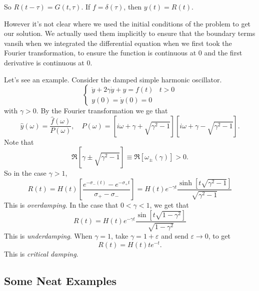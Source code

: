 \documentclass{article}
\begin{document}
So $ R(t-\tau)=G(t,\tau) $. If $ f=\delta(\tau) $, then $ y(t)=R(t) $.\par
However it's not clear where we used the initial conditions of the problem to get our solution. We actually used them implicitly to ensure that the boundary terms vansih when we integrated the differential equation when we first took the Fourier transformation, to ensure the function is continuous at $ 0 $ and the first derivative is continuous at $ 0 $.\par
Let's see an example. Consider the damped simple harmonic oscillator.
\[
  \begin{cases}
	  \ddot y + 2\gamma \dot y+y=f(t) & t>0\\
	  y(0) = \dot y(0)=0
  \end{cases}
\]
with $ \gamma>0 $. By the Fourier transformation we ge that
\[
	\hat y(\omega)=\frac{\hat f(\omega)}{P(\omega)},\quad P(\omega)=[i\omega+\gamma+\sqrt{\gamma^2-1}][i\omega+\gamma-\sqrt{\gamma^2-1}].
\]
Note that
\[
	\Re[\gamma\pm \sqrt{\gamma^2-1}]\equiv \Re[\omega_\pm(\gamma)]>0.
\]
So in the case $ \gamma>1 $,
\[
	R(t)=H(t)\left[\frac{e^{-\sigma_-(t)}-e^{-\sigma_+t}}{\sigma_+-\sigma_-}\right]=H(t)e^{-\gamma t}\frac{\sinh[t\sqrt{\gamma^2-1}]}{\sqrt{\gamma^2-1}}
\]
This is \textit{overdamping}. In the case that $ 0<\gamma<1 $, we get that
\[
	R(t)=H(t)e^{-\gamma t }\frac{\sin[t\sqrt{1-\gamma^2}]}{\sqrt{1-\gamma^2}}
\]
This is \textit{underdamping}. When $ \gamma=1 $, take $ \gamma=1+\varepsilon $ and send $ \varepsilon\to 0 $, to get
\[
	R(t)=H(t)te^{-t}.
\]
This is \textit{critical damping}.
\subsection{Some Neat Examples}
\end{document}
